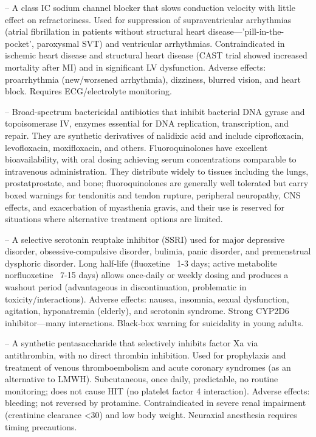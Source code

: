 -- A class IC sodium channel blocker that slows conduction velocity with little effect on refractoriness. Used for suppression of supraventricular arrhythmias (atrial fibrillation in patients without structural heart disease—'pill-in-the-pocket', paroxysmal SVT) and ventricular arrhythmias. Contraindicated in ischemic heart disease and structural heart disease (CAST trial showed increased mortality after MI) and in significant LV dysfunction. Adverse effects: proarrhythmia (new/worsened arrhythmia), dizziness, blurred vision, and heart block. Requires ECG/electrolyte monitoring.

-- Broad-spectrum bactericidal antibiotics that inhibit bacterial DNA gyrase and topoisomerase IV, enzymes essential for DNA replication, transcription, and repair. They are synthetic derivatives of nalidixic acid and include ciprofloxacin, levofloxacin, moxifloxacin, and others. Fluoroquinolones have excellent bioavailability, with oral dosing achieving serum concentrations comparable to intravenous administration. They distribute widely to tissues including the lungs, prostatprostate, and bone; fluoroquinolones are generally well tolerated but carry boxed warnings for tendonitis and tendon rupture, peripheral neuropathy, CNS effects, and exacerbation of myasthenia gravis, and their use is reserved for situations where alternative treatment options are limited.

-- A selective serotonin reuptake inhibitor (SSRI) used for major depressive disorder, obsessive-compulsive disorder, bulimia, panic disorder, and premenstrual dysphoric disorder. Long half-life (fluoxetine ~1-3 days; active metabolite norfluoxetine ~7-15 days) allows once-daily or weekly dosing and produces a washout period (advantageous in discontinuation, problematic in toxicity/interactions). Adverse effects: nausea, insomnia, sexual dysfunction, agitation, hyponatremia (elderly), and serotonin syndrome. Strong CYP2D6 inhibitor—many interactions. Black-box warning for suicidality in young adults.

-- A synthetic pentasaccharide that selectively inhibits factor Xa via antithrombin, with no direct thrombin inhibition. Used for prophylaxis and treatment of venous thromboembolism and acute coronary syndromes (as an alternative to LMWH). Subcutaneous, once daily, predictable, no routine monitoring; does not cause HIT (no platelet factor 4 interaction). Adverse effects: bleeding; not reversed by protamine. Contraindicated in severe renal impairment (creatinine clearance <30) and low body weight. Neuraxial anesthesia requires timing precautions.

